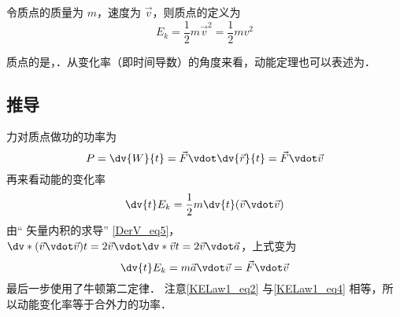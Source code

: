 

令质点的质量为 $m$，速度为 $\vec v$，则质点的定义为
\begin{equation}
E_k = \frac12 m\vec v^2 = \frac12 mv^2
\end{equation}

质点的是，．从变化率（即时间导数）的角度来看，动能定理也可以表述为．

\subsection{推导}
力对质点做功的功率为
\begin{equation}\label{KELaw1_eq2}
P = \dv{W}{t} =  \vec F\vdot \dv{\vec r}{t} = \vec F\vdot\vec v
\end{equation}
再来看动能的变化率
\begin{equation}
\dv{t} E_k = \frac12 m\dv{t} (\vec v\vdot\vec v)
\end{equation}
由“ 矢量内积的求导” \autoref{DerV_eq5}，$\dv*{(\vec v\vdot\vec v)}{t} = 2\vec v\vdot \dv*{\vec v}{t} = 2\vec v\vdot\vec a$，上式变为
\begin{equation}\label{KELaw1_eq4}
\dv{t} E_k = m\vec a\vdot\vec v = \vec F\vdot\vec v
\end{equation}
最后一步使用了牛顿第二定律．%
注意\autoref{KELaw1_eq2} 与\autoref{KELaw1_eq4} 相等，所以动能变化率等于合外力的功率．
